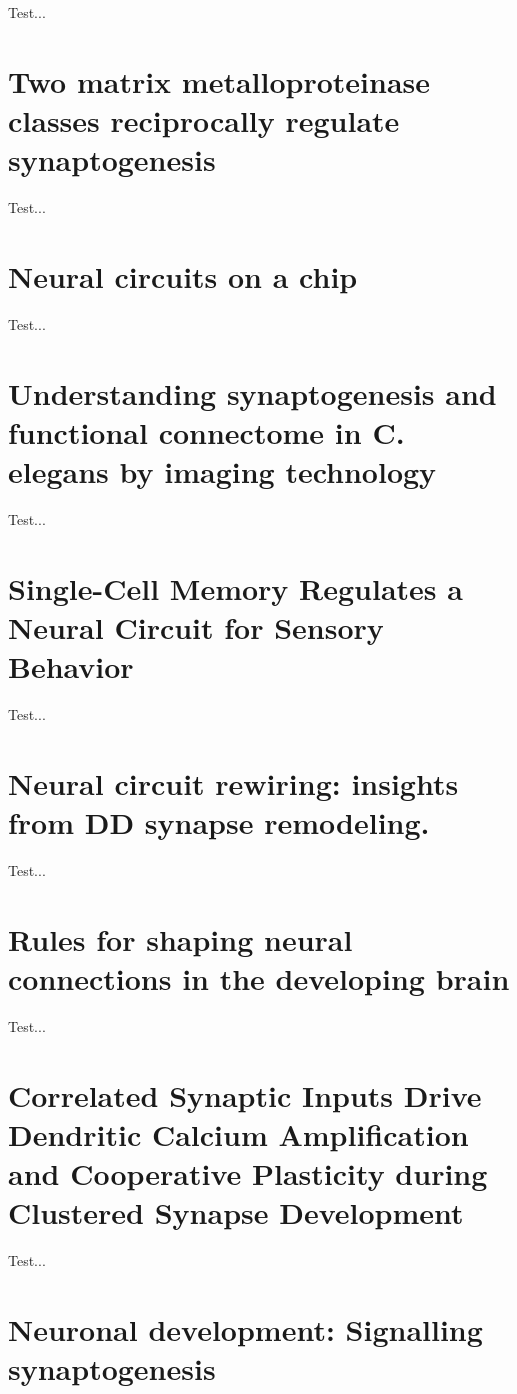 \documentclass[11pt, a4paper, oneside]{article}   	%
\begin{document}
Test...

\section{Two matrix metalloproteinase classes reciprocally regulate synaptogenesis \cite{Dear2015}}

Test...

\section{Neural circuits on a chip \cite{Hasan2016}}

Test...

\section{Understanding synaptogenesis and functional connectome in C. elegans by imaging technology \cite{Hong2016}}

Test...

\section{Single-Cell Memory Regulates a Neural Circuit for Sensory Behavior \cite{Kobayashi2016}}

Test...

\section{Neural circuit rewiring: insights from DD synapse remodeling. \cite{Kurup2016}}

Test...

\section{Rules for shaping neural connections in the developing brain \cite{Kutsarova2016}}

Test...

\section{Correlated Synaptic Inputs Drive Dendritic Calcium Amplification and Cooperative Plasticity during Clustered Synapse Development \cite{Lee2016}}

Test...

\section{Neuronal development: Signalling synaptogenesis \cite{Lewis2016}}
\end{document}
